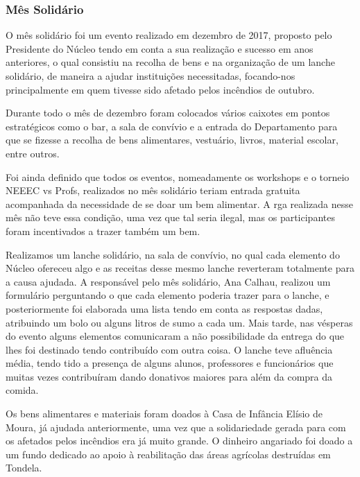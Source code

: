 
\subsubsection{Mês Solidário}

O mês solidário foi um evento realizado em dezembro de 2017, proposto pelo Presidente do Núcleo tendo em conta a sua realização e sucesso em anos anteriores, o qual consistiu na recolha de bens e na organização de um lanche solidário, de maneira a ajudar instituições necessitadas, focando-nos principalmente em quem tivesse sido afetado pelos incêndios de outubro.

Durante todo o mês de dezembro foram colocados vários caixotes em pontos estratégicos como o bar, a sala de convívio e a entrada do Departamento para que se fizesse a recolha de bens alimentares, vestuário, livros, material escolar, entre outros.

Foi ainda definido que todos os eventos, nomeadamente os workshops e o torneio NEEEC vs Profs, realizados no mês solidário teriam entrada gratuita acompanhada da necessidade de se doar um bem alimentar. A \acrshort{rga} realizada nesse mês não teve essa condição, uma vez que tal seria ilegal, mas os participantes foram incentivados a trazer também um bem.

Realizamos um lanche solidário, na sala de convívio, no qual cada elemento do Núcleo ofereceu algo e as receitas desse mesmo lanche reverteram totalmente para a causa ajudada. A responsável pelo mês solidário, Ana Calhau, realizou um formulário perguntando o que cada elemento poderia trazer para o lanche, e posteriormente foi elaborada uma lista tendo em conta as respostas dadas, atribuindo um bolo ou alguns litros de sumo a cada um. Mais tarde, nas vésperas do evento alguns elementos comunicaram a não possibilidade da entrega do que lhes foi destinado tendo contribuído com outra coisa. O lanche teve afluência média, tendo tido a presença de alguns alunos, professores e funcionários que muitas vezes contribuíram dando donativos maiores para além da compra da comida.

Os bens alimentares e materiais foram doados à Casa de Infância Elísio de Moura, já ajudada anteriormente, uma vez que a solidariedade gerada para com os afetados pelos incêndios era já muito grande. O dinheiro angariado foi doado a um fundo dedicado ao apoio à reabilitação das áreas agrícolas destruídas em Tondela.

